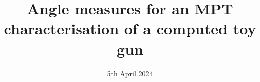 \documentclass[a4paper,12]{article}
\theoremstyle{definition}
\begin{document}
\title{Angle measures for an MPT characterisation of a computed toy gun}
\date{5th April 2024}
\maketitle

%
%
%
%  
%
%
%
{}
\end{document}
